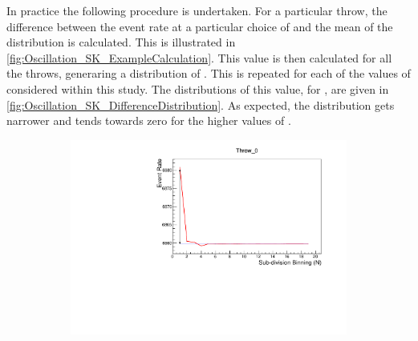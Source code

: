 In practice the following procedure is undertaken. For a particular throw, the difference between the event rate at a particular choice of  and the mean of the distribution is calculated. This is illustrated in \autoref{fig:Oscillation_SK_ExampleCalculation}. This value is then calculated for all the  throws, generaring a distribution of . This is repeated for each of the values of  considered within this study. The distributions of this value, for , are given in \autoref{fig:Oscillation_SK_DifferenceDistribution}. As expected, the distribution gets narrower and tends towards zero for the higher values of . 

\begin{figure}[h]                                                                                                                                                                                          
  \begin{subfigure}[t]{\textwidth}
    \includegraphics[width=\textwidth, trim={0mm 0mm 0mm 0mm}, clip,page=1]{Figures/Oscillation/ExampleCalculation.pdf}
  \end{subfigure}
  \caption{}
  \label{fig:Oscillation_SK_ExampleCalculation}
\end{figure}


